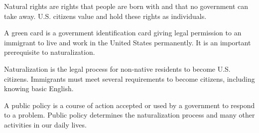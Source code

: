\begin{definition}
    Natural rights are rights that people are born with and that no government
    can take away. U.S. citizens value and hold these rights as individuals.
\end{definition}

\begin{definition}
    A green card is a government identification card giving legal permission to
    an immigrant to live and work in the United States permanently. It is an
    important prerequisite to naturalization.
\end{definition}

\begin{definition}[Naturalization]
    Naturalization is the legal process for non-native residents to become U.S.
    citizens. Immigrants must meet several requirements to become citizens,
    including knowing basic English.
\end{definition}

\begin{definition}
    A public policy is a course of action accepted or used by a government to
    respond to a problem. Public policy determines the naturalization process
    and many other activities in our daily lives.
\end{definition}

\newpage
